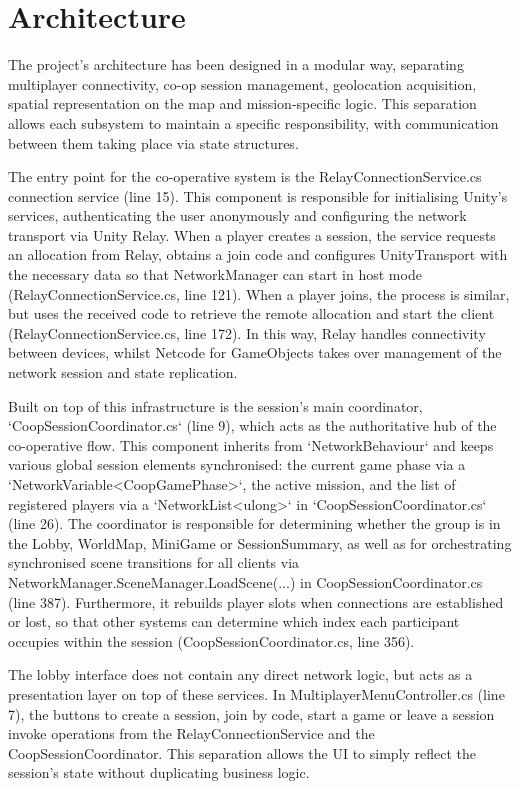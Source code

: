 \section{Architecture}
The project’s architecture has been designed in a modular way, separating multiplayer connectivity, co-op session management, geolocation acquisition, spatial representation on the map and mission-specific logic. This separation allows each subsystem to maintain a specific responsibility, with communication between them taking place via state structures.

The entry point for the co-operative system is the RelayConnectionService.cs connection service (line 15). This component is responsible for initialising Unity’s services, authenticating the user anonymously and configuring the network transport via Unity Relay. When a player creates a session, the service requests an allocation from Relay, obtains a join code and configures UnityTransport with the necessary data so that NetworkManager can start in host mode (RelayConnectionService.cs, line 121). When a player joins, the process is similar, but uses the received code to retrieve the remote allocation and start the client (RelayConnectionService.cs, line 172). In this way, Relay handles connectivity between devices, whilst Netcode for GameObjects takes over management of the network session and state replication.

Built on top of this infrastructure is the session’s main coordinator, `CoopSessionCoordinator.cs` (line 9), which acts as the authoritative hub of the co-operative flow. This component inherits from `NetworkBehaviour` and keeps various global session elements synchronised: the current game phase via a `NetworkVariable<CoopGamePhase>`, the active mission, and the list of registered players via a `NetworkList<ulong>` in `CoopSessionCoordinator.cs` (line 26). The coordinator is responsible for determining whether the group is in the Lobby, WorldMap, MiniGame or SessionSummary, as well as for orchestrating synchronised scene transitions for all clients via NetworkManager.SceneManager.LoadScene(...) in CoopSessionCoordinator.cs (line 387). Furthermore, it rebuilds player slots when connections are established or lost, so that other systems can determine which index each participant occupies within the session (CoopSessionCoordinator.cs, line 356).

The lobby interface does not contain any direct network logic, but acts as a presentation layer on top of these services. In MultiplayerMenuController.cs (line 7), the buttons to create a session, join by code, start a game or leave a session invoke operations from the RelayConnectionService and the CoopSessionCoordinator. This separation allows the UI to simply reflect the session’s state without duplicating business logic.

